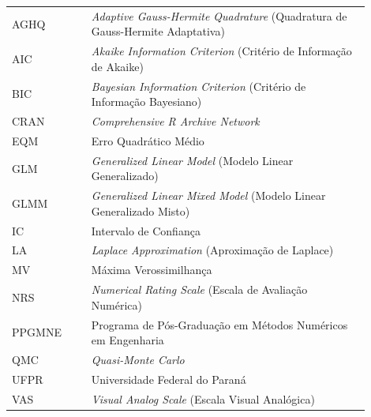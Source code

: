
\begin{listaacron}

\begin{longtable}[l]{p{0.2\linewidth}p{0.7\linewidth}}
AGHQ  & \textit{Adaptive Gauss-Hermite Quadrature} (Quadratura de Gauss-Hermite Adaptativa)\\
AIC   & \textit{Akaike Information Criterion} (Critério de Informação de Akaike)\\
BIC   & \textit{Bayesian Information Criterion} (Critério de Informação Bayesiano)\\
CRAN  & \textit{Comprehensive R Archive Network}\\
EQM   & Erro Quadrático Médio\\
GLM   & \textit{Generalized Linear Model} (Modelo Linear Generalizado)\\
GLMM  & \textit{Generalized Linear Mixed Model} (Modelo Linear Generalizado Misto)\\
IC    & Intervalo de Confiança\\
LA    & \textit{Laplace Approximation} (Aproximação de Laplace)\\
MV    & Máxima Verossimilhança\\
NRS   & \textit{Numerical Rating Scale} (Escala de Avaliação Numérica)\\
PPGMNE & Programa de Pós-Graduação em Métodos Numéricos em Engenharia\\
QMC   & \textit{Quasi-Monte Carlo}\\
UFPR  & Universidade Federal do Paraná\\
VAS   & \textit{Visual Analog Scale} (Escala Visual Analógica)\\
\end{longtable}

\end{listaacron}
